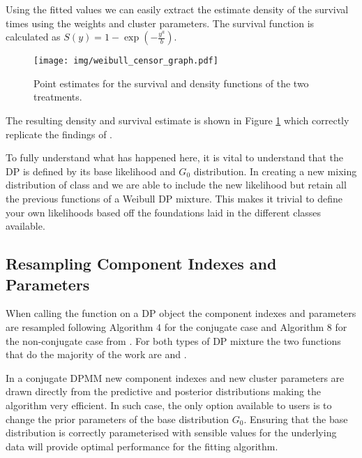 \documentclass[nojss]{jss}
\begin{document}
Using the fitted values we can easily extract the estimate density of the survival times using the weights and cluster parameters. The survival function is calculated as $S(y) = 1 - \exp(- \frac{y ^a}{b})$.
\begin{figure}
\centering
\texttt{[image: img/weibull\_censor\_graph.pdf]}
\caption{Point estimates for the survival and density functions of the two treatments.}
\label{fig:weibull_cens}
\end{figure}
The resulting density and survival estimate is shown in Figure \ref{fig:weibull_cens} which correctly replicate the findings of \cite{kottas_nonparametric_2006}.

To fully understand what has happened here, it is vital to understand that the DP is defined by its base likelihood and $G_0$ distribution. In creating a new mixing distribution of class  and  we are able to include the new likelihood but retain all the previous functions of a Weibull DP mixture. This makes it trivial to define your own likelihoods based off the foundations laid in the different classes available.


\subsection{Resampling Component Indexes and Parameters}
When calling the  function on a DP object the component indexes and parameters are resampled following Algorithm 4 for the conjugate case and Algorithm 8 for the non-conjugate case from \cite{neal_markov_2000}. For both types of DP mixture the two functions that do the majority of the work are  and .

In a conjugate DPMM new component indexes and new cluster parameters are drawn directly from the predictive and posterior distributions making the algorithm very efficient. In such case, the only option available to users is to change the prior parameters of the base distribution $G_0$. Ensuring that the base distribution is correctly parameterised with sensible values for the underlying data will provide optimal performance for the fitting algorithm.
\end{document}
